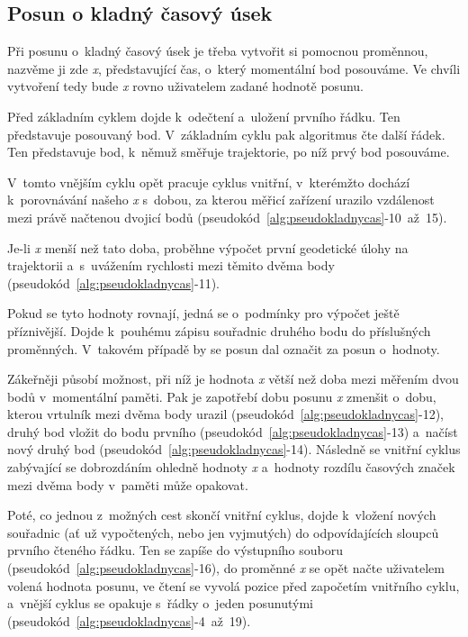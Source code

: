 \subsection{Posun o kladný časový úsek}
\label{kladnycas}

Při posunu o~kladný časový úsek je třeba vytvořit si pomocnou proměnnou, nazvěme ji zde \textit{x},
představující čas, o~který momentální bod posouváme. Ve chvíli vytvoření tedy bude \textit{x}
rovno uživatelem zadané hodnotě posunu. 

Před základním cyklem dojde k~odečtení a~uložení prvního řádku. Ten představuje posouvaný bod.
V~základním cyklu pak algoritmus čte další řádek. Ten představuje bod, k~němuž směřuje
trajektorie, po níž prvý bod posouváme. 

V~tomto vnějším cyklu opět pracuje cyklus vnitřní, v~kterémžto dochází k~porov\-ná\-vá\-ní našeho
\textit{x} s~dobou, za kterou měřicí zařízení urazilo vzdálenost mezi právě načtenou dvojicí bodů
(pseudokód~\ref{alg:pseudokladnycas}-10~až~15). 

Je-li \textit{x} menší než tato doba, proběhne výpočet první geodetické úlohy na trajektorii
a~s~uvážením rychlosti mezi těmito dvěma body (pseudokód~\ref{alg:pseudokladnycas}-11). 

Pokud se tyto hodnoty rovnají, jedná se o~podmínky pro výpočet ještě příznivější. Dojde k~pouhému
zápisu souřadnic druhého bodu do příslušných proměnných. V~ta\-ko\-vém
případě by se posun dal označit za posun o~hodnoty. 

Zákeřněji působí možnost, při níž je hodnota \textit{x} větší než doba mezi měřením dvou
bodů v~momentální paměti. Pak je zapotřebí dobu posunu \textit{x} zmenšit o~dobu, kterou
vrtulník mezi dvěma body urazil (pseudokód~\ref{alg:pseudokladnycas}-12),
druhý bod vložit do bodu prvního (pseudokód~\ref{alg:pseudokladnycas}-13) a~načíst
nový druhý bod (pseudokód~\ref{alg:pseudokladnycas}-14). Následně
se vnitřní cyklus zabývající se dobrozdáním ohledně hodnoty \textit{x} a~hodnoty
rozdílu časových značek mezi dvěma body v~paměti může opakovat. 

Poté, co jednou z~možných cest skončí vnitřní cyklus, dojde k~vložení nových souřadnic
(ať už vypočtených, nebo jen vyjmutých) do odpovídajících sloupců první\-ho čteného řádku.
Ten se zapíše do výstupního souboru (pseudokód~\ref{alg:pseudokladnycas}-16),
do proměnné \textit{x} se opět načte uživatelem volená
hodnota posunu, ve čtení se vyvolá pozice před započetím vnitřního cyklu, a~vnější cyklus se
opakuje s~řádky o~jeden posunutými (pseudokód~\ref{alg:pseudokladnycas}-4~až~19). 

